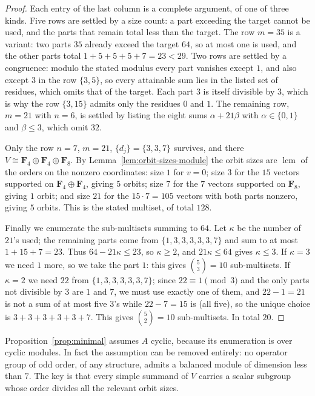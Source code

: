 \documentclass[11pt,a4paper,reqno]{amsart}
\theoremstyle{definition}
\theoremstyle{remark}
\newcommand{\F}{\mathbf F}
\begin{document}
\begin{proof}
Each entry of the last column is a complete argument, of one of three
kinds.  Five rows are settled by a size count: a part exceeding the
target cannot be used, and the parts that remain total less than the
target.  The row $m=35$ is a variant: two parts $35$ already exceed the
target $64$, so at most one is used, and the other parts total
$1+5+5+5+7=23<29$.  Two rows are settled by a congruence: modulo the
stated modulus every part vanishes except $1$, and also except $3$ in
the row $\{3,5\}$, so every attainable sum lies in the listed set of
residues, which omits that of the target.  Each part $3$ is itself
divisible by $3$, which is why the row $\{3,15\}$ admits only the
residues $0$ and $1$.  The remaining row, $m=21$ with $n=6$, is settled by listing the
eight sums $\alpha+21\beta$ with $\alpha\in\{0,1\}$ and $\beta\le3$,
which omit $32$.

Only the row $n=7$, $m=21$, $\{d_j\}=\{3,3,7\}$ survives, and there
$V\cong\F_4\oplus\F_4\oplus\F_8$.  By
Lemma~\ref{lem:orbit-sizes-module} the orbit sizes are
$\operatorname{lcm}$ of the orders on the nonzero coordinates:
size $1$ for $v=0$; size $3$ for the $15$ vectors supported on
$\F_4\oplus\F_4$, giving $5$ orbits; size $7$ for the $7$ vectors
supported on $\F_8$, giving $1$ orbit; and size $21$ for the
$15\cdot7=105$ vectors with both parts nonzero, giving $5$ orbits.
This is the stated multiset, of total $128$.

Finally we enumerate the sub-multisets summing to $64$.  Let $\kappa$
be the number of $21$'s used; the remaining parts come from
$\{1,3,3,3,3,3,7\}$ and sum to at most $1+15+7=23$.  Thus
$64-21\kappa\le23$, so $\kappa\ge2$, and $21\kappa\le64$ gives
$\kappa\le3$.  If $\kappa=3$ we need $1$ more, so we take the part $1$:
this gives $\binom53=10$ sub-multisets.  If $\kappa=2$ we need $22$
from $\{1,3,3,3,3,3,7\}$; since $22\equiv1\pmod3$ and the only parts
not divisible by $3$ are $1$ and $7$, we must use exactly one of them,
and $22-1=21$ is not a sum of at most five $3$'s while $22-7=15$ is
(all five), so the unique choice is $3+3+3+3+3+7$.  This gives
$\binom52=10$ sub-multisets.  In total $20$.
\end{proof}

Proposition~\ref{prop:minimal} assumes $A$ cyclic, because its
enumeration is over cyclic modules.  In fact the assumption can be
removed entirely: no operator group of odd order, of any structure,
admits a balanced module of dimension less than $7$.  The key is that
every simple summand of $V$ carries a scalar subgroup whose order
divides all the relevant orbit sizes.
\end{document}
